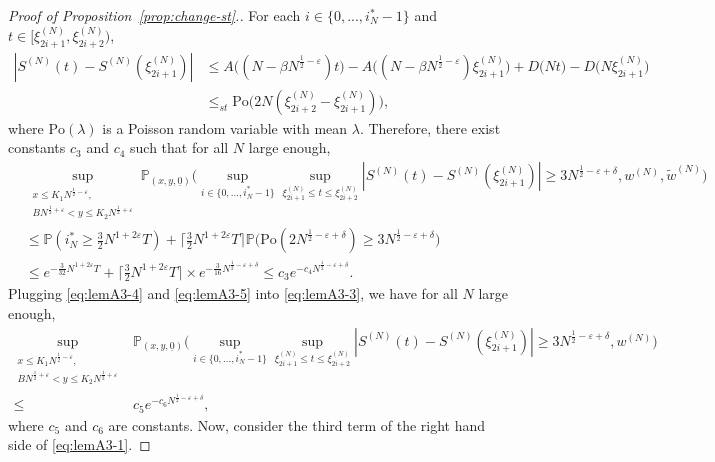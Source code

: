\documentclass[11pt, reqno]{article}
\numberwithin{equation}{section}
\numberwithin{theorem}{section}
\begin{document}
\begin{appendix}
\begin{proof}[Proof of Proposition~\ref{prop:change-st}.]
For each $i\in\{0,...,i^*_N-1\}$ and $t\in[\xi^{(N)}_{2i+1},\xi^{(N)}_{2i+2})$, \begin{align*}
    \left|S^{(N)}(t)-S^{(N)}(\xi^{(N)}_{2i+1})\right|&\leq A\big((N-\beta N^{\frac{1}{2}-\varepsilon})t\big) - A\big((N-\beta N^{\frac{1}{2}-\varepsilon})\xi^{(N)}_{2i+1}\big)
    +D\big(Nt\big) - D\big(N\xi^{(N)}_{2i+1}\big)\\
    &\leq_{st} \mathrm{Po}\big(2N(\xi^{(N)}_{2i+2}-\xi^{(N)}_{2i+1})\big),
\end{align*}
where $\mathrm{Po}(\lambda)$ is a Poisson random variable with mean $\lambda$.
Therefore, there exist constants $c_3$ and $c_4$ such that for all $N$ large enough,
\begin{align}\label{eq:lemA3-5}
   & \sup_{\substack{x\leq K_1N^{\frac{1}{2} - \varepsilon},\\ BN^{\frac{1}{2} + \varepsilon} <y\leq K_2N^{\frac{1}{2} + \varepsilon}}}\mathbb{P}_{(x,y, \underline{0})}\Big(\sup_{i\in \{0,...,i^*_N-1\}}\sup_{\xi^{(N)}_{2i+1}\leq t\leq \xi^{(N)}_{2i+2}}\left|S^{(N)}(t)-S^{(N)}(\xi^{(N)}_{2i+1})\right|\geq 3N^{\frac{1}{2}-\varepsilon+\delta},w^{(N)},\tilde{w}^{(N)}\Big)\nonumber\\
   &\leq \mathbb{P}(i^*_N\geq \frac{3}{2}N^{1+2\varepsilon}T)+\Big\lceil\frac{3}{2}N^{1+2\varepsilon}T\Big\rceil \mathbb{P}\Big(\mathrm{Po}(2N^{\frac{1}{2}-\varepsilon+\delta})\geq3N^{\frac{1}{2}-\varepsilon+\delta}\Big)\nonumber\\
   &\leq  e^{-\frac{3}{32}N^{1+2\varepsilon}T}+\Big\lceil\frac{3}{2}N^{1+2\varepsilon}T\Big\rceil\times e^{-\frac{3}{16}N^{\frac{1}{2}-\varepsilon+\delta}}\leq c_3e^{-c_4N^{\frac{1}{2}-\varepsilon+\delta}}.
\end{align}
Plugging \eqref{eq:lemA3-4} and \eqref{eq:lemA3-5} into \eqref{eq:lemA3-3}, we have for all $N$ large enough,
\begin{align}\label{eq:lemA3-6}
    \sup_{\substack{x\leq K_1N^{\frac{1}{2} - \varepsilon},\\ BN^{\frac{1}{2} + \varepsilon} <y\leq K_2N^{\frac{1}{2} + \varepsilon}}}&\mathbb{P}_{(x,y, \underline{0})}\Big(\sup_{i\in \{0,...,i^*_N-1\}}\sup_{\xi^{(N)}_{2i+1}\leq t\leq \xi^{(N)}_{2i+2}}\left|S^{(N)}(t)-S^{(N)}(\xi^{(N)}_{2i+1})\right|\geq 3N^{\frac{1}{2}-\varepsilon+\delta},w^{(N)}\Big)\nonumber\\
    \leq& c_5e^{-c_6N^{\frac{1}{2}-\varepsilon+\delta}},
\end{align}
where $c_5$ and $c_6$ are constants. Now, consider the third term of the right hand side of \eqref{eq:lemA3-1}.

\end{proof}
\end{appendix}
\end{document}
